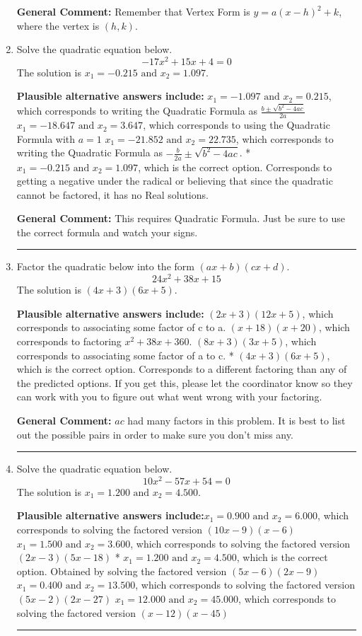 \documentclass{extbook}[14pt]
\newcommand{\litem}[1]{\item #1

\rule{\textwidth}{0.4pt}}
\begin{document}
\begin{enumerate}
{\textbf{General Comment:} Remember that Vertex Form is $y = a(x-h)^2+k$, where the vertex is $(h, k)$.
}
\litem{
Solve the quadratic equation below.
\[ -17x^{2} +15 x + 4 = 0 \]The solution is \( x_1 = -0.215 \text{ and } x_2 = 1.097 \).\begin{enumerate}[label=\Alph*.]
\textbf{Plausible alternative answers include:} $x_1 = -1.097 \text{ and } x_2 = 0.215$, which corresponds to writing the Quadratic Formula as $\frac{b \pm \sqrt{b^2 - 4ac}}{2a}$
 $x_1 = -18.647 \text{ and } x_2 = 3.647$, which corresponds to using the Quadratic Formula with $a=1$
 $x_1 = -21.852 \text{ and } x_2 = 22.735$, which corresponds to writing the Quadratic Formula as $-\frac{b}{2a} \pm \sqrt{b^2 - 4ac}$.
* $x_1 = -0.215 \text{ and } x_2 = 1.097$, which is the correct option.
Corresponds to getting a negative under the radical or believing that since the quadratic cannot be factored, it has no Real solutions.
\end{enumerate}

\textbf{General Comment:} This requires Quadratic Formula. Just be sure to use the correct formula and watch your signs.
}
\litem{
Factor the quadratic below into the form $(ax+b)(cx+d)$.
\[ 24x^{2} +38 x + 15 \]The solution is \( (4x + 3)(6x + 5) \).\begin{enumerate}[label=\Alph*.]
\textbf{Plausible alternative answers include:} $(2x + 3)(12x + 5)$, which corresponds to associating some factor of c to a.
 $(x + 18)(x + 20)$, which corresponds to factoring $x^{2} +38 x + 360$.
 $(8x + 3)(3x + 5)$, which corresponds to associating some factor of a to c.
* $(4x + 3)(6x + 5)$, which is the correct option.
 Corresponds to a different factoring than any of the predicted options. If you get this, please let the coordinator know so they can work with you to figure out what went wrong with your factoring.
\end{enumerate}

\textbf{General Comment:} $ac$ had many factors in this problem. It is best to list out the possible pairs in order to make sure you don't miss any.
}
\litem{
Solve the quadratic equation below.
\[ 10x^{2} -57 x + 54 = 0 \]The solution is \( x_1 = 1.200 \text{ and } x_2 = 4.500 \).\begin{enumerate}[label=\Alph*.]
\textbf{Plausible alternative answers include:}$x_1 = 0.900 \text{ and } x_2 = 6.000$, which corresponds to solving the factored version $(10x -9)(x -6)$
$x_1 = 1.500 \text{ and } x_2 = 3.600$, which corresponds to solving the factored version $(2x -3)(5x -18)$
* $x_1 = 1.200 \text{ and } x_2 = 4.500$, which is the correct option. Obtained by solving the factored version $(5x -6)(2x -9)$
$x_1 = 0.400 \text{ and } x_2 = 13.500$, which corresponds to solving the factored version $(5x -2)(2x -27)$
$x_1 = 12.000 \text{ and } x_2 = 45.000$, which corresponds to solving the factored version $(x -12)(x -45)$
\end{enumerate}

}
\end{enumerate}
\end{document}
